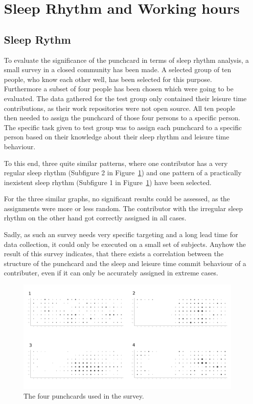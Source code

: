 \section{Sleep Rhythm and Working hours}

\subsection{Sleep Rythm}
To evaluate the significance of the punchcard in terms of sleep rhythm analysis, a small survey in a closed community has been made.
A selected group of ten people, who know each other well, has been selected for this purpose.
Furthermore a subset of four people has been chosen which were going to be evaluated.
The data gathered for the test group only contained their leisure time contributions, as their work repositories were not open source.
All ten people then needed to assign the punchcard of those four persons to a specific person.
The specific task given to test group was to assign each punchcard to a specific person based on their knowledge about their sleep rhythm and leisure time behaviour.

To this end, three quite similar patterns, where one contributor has a very regular sleep rhythm (Subfigure 2 in Figure~\ref{fig:punchcard-survey}) and one pattern of a practically inexistent sleep rhythm (Subfigure 1 in Figure~\ref{fig:punchcard-survey}) have been selected.

For the three similar graphs, no significant results could be assessed, as the assignments were more or less random.
The contributor with the irregular sleep rhythm on the other hand got correctly assigned in all cases.

Sadly, as such an survey needs very specific targeting and a long lead time for data collection, it could only be executed on a small set of subjects.
Anyhow the result of this survey indicates, that there exists a correlation between the structure of the punchcard and the sleep and leisure time commit behaviour of a contributer, even if it can only be accurately assigned in extreme cases.


\begin{figure}[H]
    \includegraphics[scale=0.16]{./graphs/analysis/survey_combined}
    \centering
    \caption{The four punchcards used in the survey.}\label{fig:punchcard-survey}
\end{figure}

